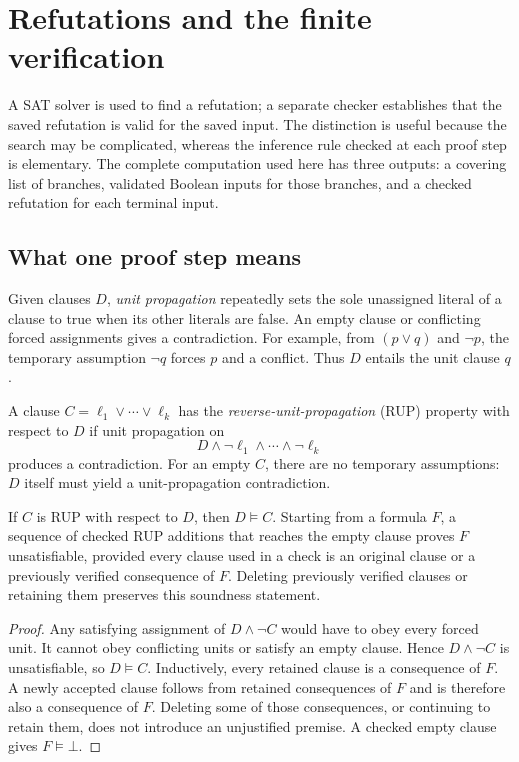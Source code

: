 \section{Refutations and the finite verification}\label{sec:certificates}
A SAT solver is used to find a refutation; a separate checker establishes
that the saved refutation is valid for the saved input. The distinction is
useful because the search may be complicated, whereas the inference rule
checked at each proof step is elementary. The complete computation used
here has three outputs: a covering list of branches, validated Boolean
inputs for those branches, and a checked refutation for each terminal input.

\subsection{What one proof step means}
Given clauses $D$, \emph{unit propagation} repeatedly sets the sole
unassigned literal of a clause to true when its other literals are false.
An empty clause or conflicting forced assignments gives a contradiction.
For example, from $(p\lor q)$ and $\neg p$, the temporary assumption
$\neg q$ forces $p$ and a conflict. Thus $D$ entails the unit clause $q$.

\begin{definition}
A clause $C=\ell_1\lor\cdots\lor\ell_k$ has the
\emph{reverse-unit-propagation} (RUP) property with respect to $D$ if unit
propagation on
\[
D\land\neg\ell_1\land\cdots\land\neg\ell_k
\]
produces a contradiction. For an empty $C$, there are no temporary
assumptions: $D$ itself must yield a unit-propagation contradiction.
\end{definition}

\begin{lemma}\label{lem:rup}
If $C$ is RUP with respect to $D$, then $D\models C$. Starting from a
formula $F$, a sequence of checked RUP additions that reaches the empty
clause proves $F$ unsatisfiable, provided every clause used in a check is
an original clause or a previously verified consequence of $F$.
Deleting previously verified clauses or retaining them preserves this
soundness statement.
\end{lemma}
\begin{proof}
Any satisfying assignment of $D\land\neg C$ would have to obey every
forced unit. It cannot obey conflicting units or satisfy an empty clause.
Hence $D\land\neg C$ is unsatisfiable, so $D\models C$.
Inductively, every retained clause is a consequence of $F$. A newly
accepted clause follows from retained consequences of $F$ and is
therefore also a consequence of $F$. Deleting some of those consequences,
or continuing to retain them, does not introduce an unjustified premise.
A checked empty clause gives $F\models\bot$.
\end{proof}

